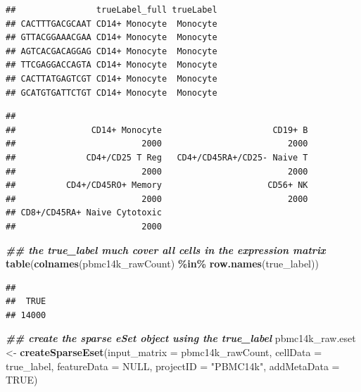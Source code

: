 \documentclass[
  12pt,
]{book}
\newenvironment{Shaded}{\begin{snugshade}}{\end{snugshade}}
\newcommand{\AttributeTok}[1]{\textcolor[rgb]{0.13,0.29,0.53}{#1}}
\newcommand{\ConstantTok}[1]{\textcolor[rgb]{0.56,0.35,0.01}{#1}}
\newcommand{\DocumentationTok}[1]{\textcolor[rgb]{0.56,0.35,0.01}{\textbf{\textit{#1}}}}
\newcommand{\FunctionTok}[1]{\textcolor[rgb]{0.13,0.29,0.53}{\textbf{#1}}}
\newcommand{\NormalTok}[1]{#1}
\newcommand{\OtherTok}[1]{\textcolor[rgb]{0.56,0.35,0.01}{#1}}
\newcommand{\SpecialCharTok}[1]{\textcolor[rgb]{0.81,0.36,0.00}{\textbf{#1}}}
\newcommand{\StringTok}[1]{\textcolor[rgb]{0.31,0.60,0.02}{#1}}
\begin{document}
\begin{verbatim}
##                trueLabel_full trueLabel
## CACTTTGACGCAAT CD14+ Monocyte  Monocyte
## GTTACGGAAACGAA CD14+ Monocyte  Monocyte
## AGTCACGACAGGAG CD14+ Monocyte  Monocyte
## TTCGAGGACCAGTA CD14+ Monocyte  Monocyte
## CACTTATGAGTCGT CD14+ Monocyte  Monocyte
## GCATGTGATTCTGT CD14+ Monocyte  Monocyte
\end{verbatim}

\begin{Shaded}
\end{Shaded}

\begin{verbatim}
## 
##               CD14+ Monocyte                      CD19+ B 
##                         2000                         2000 
##              CD4+/CD25 T Reg   CD4+/CD45RA+/CD25- Naive T 
##                         2000                         2000 
##          CD4+/CD45RO+ Memory                     CD56+ NK 
##                         2000                         2000 
## CD8+/CD45RA+ Naive Cytotoxic 
##                         2000
\end{verbatim}

\begin{Shaded}
\begin{Highlighting}[]
\DocumentationTok{\#\# the true\_label much cover all cells in the expression matrix}
\FunctionTok{table}\NormalTok{(}\FunctionTok{colnames}\NormalTok{(pbmc14k\_rawCount) }\SpecialCharTok{\%in\%} \FunctionTok{row.names}\NormalTok{(true\_label))}
\end{Highlighting}
\end{Shaded}

\begin{verbatim}
## 
##  TRUE 
## 14000
\end{verbatim}

\begin{Shaded}
\begin{Highlighting}[]
\DocumentationTok{\#\# create the sparse eSet object using the true\_label}
\NormalTok{pbmc14k\_raw.eset }\OtherTok{\textless{}{-}} \FunctionTok{createSparseEset}\NormalTok{(}\AttributeTok{input\_matrix =}\NormalTok{ pbmc14k\_rawCount, }\AttributeTok{cellData =}\NormalTok{ true\_label, }\AttributeTok{featureData =} \ConstantTok{NULL}\NormalTok{, }\AttributeTok{projectID =} \StringTok{"PBMC14k"}\NormalTok{, }\AttributeTok{addMetaData =} \ConstantTok{TRUE}\NormalTok{)}
\end{Highlighting}
\end{Shaded}
\end{document}
